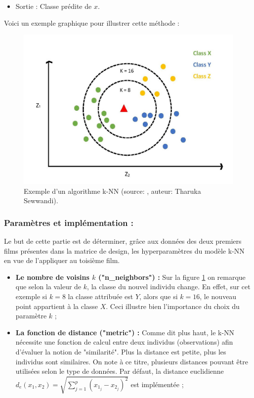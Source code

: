 \documentclass[11pt]{article}
\begin{document}
\begin{center}
\begin{itemize}
        \item Sortie : Classe prédite de $x$.
    \end{itemize}

Voici un exemple graphique pour illustrer cette méthode :

\begin{figure}[hbt!]
    \centering
    \includegraphics[width = 15 cm, height = 9 cm]{./figures/knn_example.jpeg}
    \caption{Exemple d'un algorithme k-NN (source: \cite{5}, auteur: Tharuka Sewwandi).}
    \label{12}
\end{figure}
\FloatBarrier

\subsubsection{Paramètres et implémentation :}

Le but de cette partie est de déterminer, grâce aux données des deux premiers films présentes dans la matrice de design, les hyperparamètres du modèle k-NN en vue de l'appliquer au toisième film.\par

\begin{itemize}
    \item \textbf{Le nombre de voisins $k$ ("n\_neighbors") :}
    Sur la figure \ref{12} on remarque que selon la valeur de $k$, la classe du nouvel individu change. En effet, sur cet exemple si $k=8$ la classe attribuée est $Y$, alors que si $k=16$, le nouveau point appartient à la classe $X$. Ceci illustre bien l'importance du choix du paramètre $k$ ;\par
    
    \item \textbf{La fonction de distance ("metric") :}
    Comme dit plus haut, le k-NN nécessite une fonction de calcul entre deux individus (observations) afin d'évaluer la notion de "similarité". Plus la distance est petite, plus les individus sont similaires.
    On note à ce titre, plusieurs distances pouvant être utilisées selon le type de données. Par défaut, la distance euclidienne $d_{e}(x_{1}, x_{2})=\sqrt{\sum_{j=1}^{p}\left(x_{1_j}-x_{2_j}\right)^{2}}$ est implémentée ;


\end{itemize}
\end{center}
\end{document}

